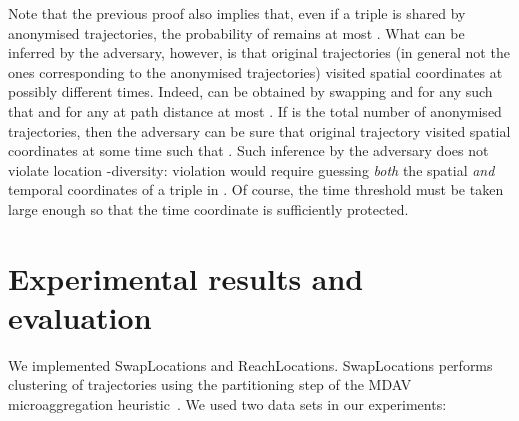 Note that the previous proof also implies
that, even if a triple  is shared
by  anonymised
trajectories, the probability of 
remains at most .
What can be inferred by the adversary,
however, is that  original trajectories
(in general not the ones corresponding to the  anonymised
trajectories) visited spatial coordinates 
at possibly different times.
Indeed,  can be obtained by swapping 
and  for any  such that 
and for any  at path distance at most .
If  is the total number of anonymised trajectories, then
the adversary can be sure that original
trajectory  visited spatial coordinates
 at some time  such that .
Such inference by the adversary does
not violate location -diversity: violation
would require guessing {\em both} the spatial {\em and} temporal coordinates
of a triple in .
Of course, the time threshold  must be taken large enough so that
the time coordinate  is sufficiently protected.

\section{Experimental results and evaluation}

We implemented SwapLocations and ReachLocations. SwapLocations
performs clustering of trajectories using the partitioning step
of the MDAV microaggregation heuristic~\cite{domingo05}.
We used two data sets in our experiments:

